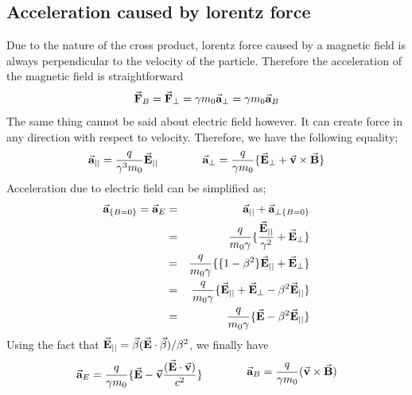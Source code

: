 \documentclass[a4paper,oneside,12pt]{report}
\numberwithin{equation}{chapter}
\begin{document}
\subsection{Acceleration caused by lorentz force}
Due to the nature of the cross product, lorentz force caused by a magnetic field is always perpendicular to the velocity of the particle. 
Therefore the acceleration of the magnetic field is straightforward
\begin{equation*}
    \vec{\textbf{F}}_B = \vec{\textbf{F}}_{\perp} = \gamma  m_0\vec{\textbf{a}}_{\perp} = \gamma  m_0\vec{\textbf{a}}_{B}
\end{equation*}
The same thing cannot be said about electric field however. 
It can create force in any direction with respect to velocity. Therefore, we have the following equality;
\begin{equation} \label{eq:para_and_perp_acc_of_lorentz_force}
    \begin{aligned}
        \vec{\textbf{a}}_{||} = \frac{q }{\gamma^3 m_0} \vec{\textbf{E}}_{||}
    \end{aligned}
    \qquad \qquad
    \begin{aligned}
        \vec{\textbf{a}}_{\perp} = \frac{q}{\gamma m_0} \{ \vec{\textbf{E}}_{\perp} + \vec{\textbf{v}} \times \vec{\textbf{B}}   \}
    \end{aligned}    
\end{equation}
Acceleration due to electric field can be simplified as;
\begin{eqnarray*}
    \vec{\textbf{a}}_{\{B=0\}} = \vec{\textbf{a}}_{E}   &=&  \vec{\textbf{a}}_{||} + \vec{\textbf{a}}_{\perp \{B=0\}} \\
                                &=& \frac{q}{m_0 \gamma} \{ \frac{\vec{\textbf{E}}_{||}}{\gamma^2} + \vec{\textbf{E}}_{\perp} \} \\
                                &=& \frac{q}{m_0 \gamma} \{ \{1 - \beta^2\}\vec{\textbf{E}}_{||} + \vec{\textbf{E}}_{\perp} \} \\
                                &=& \frac{q}{m_0 \gamma} \{ \vec{\textbf{E}}_{||} + \vec{\textbf{E}}_{\perp}-\beta^2\vec{\textbf{E}}_{||} \} \\
                                &=& \frac{q}{m_0 \gamma} \{ \vec{\textbf{E}} - \beta^2\vec{\textbf{E}}_{||} \} \\
\end{eqnarray*}
Using the fact that $\vec{\textbf{E}}_{||} = \vec{\beta}(\vec{\textbf{E}} \cdot \vec{\beta})/\beta^2 $, we finally have
\begin{equation} \label{eq:acc_of_E_and_B}
    \begin{aligned}
        \vec{\textbf{a}}_{E} = \frac{q}{ \gamma m_0} \{ \vec{\textbf{E}} - \vec{\textbf{v}}\frac{(\vec{\textbf{E}} \cdot \vec{\textbf{v}})}{c^2} \}
    \end{aligned}
    \qquad \qquad
    \begin{aligned}
        \vec{\textbf{a}}_{B} = \frac{q}{\gamma m_0} ( \vec{\textbf{v}} \times \vec{\textbf{B}} )
    \end{aligned}
\end{equation}
\end{document}
